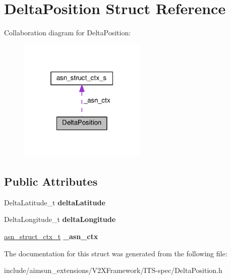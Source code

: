 \hypertarget{structDeltaPosition}{}\section{Delta\+Position Struct Reference}
\label{structDeltaPosition}


Collaboration diagram for Delta\+Position\+:\nopagebreak
\begin{figure}[H]
\begin{center}
\leavevmode
\includegraphics[width=172pt]{structDeltaPosition__coll__graph}
\end{center}
\end{figure}
\subsection*{Public Attributes}
\begin{DoxyCompactItemize}
\item 
Delta\+Latitude\+\_\+t {\bfseries delta\+Latitude}\hypertarget{structDeltaPosition_a281a9ba8bb087b67c97f1054a74a78c2}{}\label{structDeltaPosition_a281a9ba8bb087b67c97f1054a74a78c2}

\item 
Delta\+Longitude\+\_\+t {\bfseries delta\+Longitude}\hypertarget{structDeltaPosition_af71c36cc10ccf86696eb484c2fd4c24a}{}\label{structDeltaPosition_af71c36cc10ccf86696eb484c2fd4c24a}

\item 
\hyperlink{structasn__struct__ctx__s}{asn\+\_\+struct\+\_\+ctx\+\_\+t} {\bfseries \+\_\+asn\+\_\+ctx}\hypertarget{structDeltaPosition_af6835e6a990edeedf93d20540eb1d639}{}\label{structDeltaPosition_af6835e6a990edeedf93d20540eb1d639}

\end{DoxyCompactItemize}


The documentation for this struct was generated from the following file\+:\begin{DoxyCompactItemize}
\item 
include/aimsun\+\_\+extensions/\+V2\+X\+Framework/\+I\+T\+S-\/spec/Delta\+Position.\+h\end{DoxyCompactItemize}
